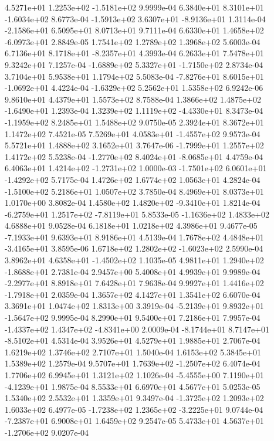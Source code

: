  4.5271e+01  1.2253e+02 -1.5181e+02  9.9999e-04
 6.3840e+01  8.3101e+01 -1.6034e+02  8.6773e-04
-1.5913e+02  3.6307e+01 -8.9136e+01  1.3114e-04
-2.1586e+01  6.5095e+01  8.0713e+01  9.7111e-04
 6.6330e+01  1.4658e+02 -6.0973e+01  2.8849e-05
1.7541e+02 1.2789e+02 1.3968e+02  5.6003e-04
 6.7136e+01  8.1718e+01 -8.2357e+01  4.3993e-04
6.2633e+01 7.5478e+01 9.3242e+01  7.1257e-04
-1.6889e+02  5.3327e+01 -1.7150e+02  2.8734e-04
3.7104e+01 5.9538e+01 1.1794e+02  5.5083e-04
-7.8276e+01  8.6015e+01 -1.0692e+01  4.4224e-04
-1.6329e+02  5.2562e+01  1.5358e+02  6.9242e-06
9.8610e+01 4.4379e+01 1.5573e+02  8.7588e-04
 1.3866e+02  1.4875e+02 -1.6490e+01  1.2393e-04
 1.3239e+02  1.1119e+02 -4.4330e+01  8.3473e-04
-1.1959e+02  8.2485e+01  1.5488e+02  9.0750e-05
2.3924e+01 8.3672e+01 1.1472e+02  7.4521e-05
 7.5269e+01  4.0583e+01 -1.4557e+02  9.9573e-04
5.5721e+01 1.4888e+02 3.1652e+01  3.7647e-06
-1.7999e+01  1.2557e+02  1.4172e+02  5.5238e-04
-1.2770e+02  8.4024e+01 -8.0685e+01  4.4759e-04
 6.4063e+01  1.4214e+02 -1.2731e+02  1.0000e-03
-1.7501e+02  6.0601e+01 -1.4292e+02  5.7175e-04
1.4726e+02 1.6774e+02 1.0563e+01  4.2824e-04
-1.5100e+02  5.2186e+01  1.0507e+02  3.7850e-04
8.4969e+01 8.0373e+01 1.0170e+00  3.8082e-04
 1.4580e+02  1.4820e+02 -9.3410e+01  1.8214e-04
-6.2759e+01  1.2517e+02 -7.8119e+01  5.8533e-05
-1.1636e+02  1.4833e+02  4.6888e+01  9.0528e-04
6.1818e+01 1.0218e+02 4.3986e+01  9.4677e-05
-7.1933e+01  9.6393e+01  8.9186e+01  4.5139e-04
 1.7678e+02  4.4848e+01 -3.4165e+01  3.8595e-06
 1.6718e+02  1.2802e+02 -1.6023e+02  2.5990e-04
 3.8962e+01  4.6358e+01 -1.4502e+02  1.1035e-05
 4.9811e+01  1.2940e+02 -1.8688e+01  2.7381e-04
2.9457e+00 5.4008e+01 4.9939e+01  9.9989e-04
-2.2977e+01  8.8918e+01  7.6428e+01  7.9638e-04
 9.9927e+01  1.4416e+02 -1.7918e+01  2.0359e-04
1.3657e+02 4.1427e+01 1.3541e+02  6.6070e-04
3.3691e+01 1.0474e+02 1.8313e+00  3.3919e-04
-5.2139e+01  9.8932e+01 -1.5647e+02  9.9995e-04
8.2990e+01 9.5400e+01 7.2186e+01  7.9957e-04
-1.4337e+02  1.4347e+02 -4.8341e+00  2.0009e-04
-8.1744e+01  8.7147e+01 -8.5102e+01  4.5314e-04
3.9526e+01 4.5279e+01 1.9885e+01  2.7067e-04
1.6219e+02 1.3746e+02 2.7107e+01  1.5040e-04
1.6153e+02 5.3845e+01 1.5389e+02  1.2579e-04
 9.5707e+01  1.7639e+02 -1.2507e+02  6.4074e-04
1.7706e+02 6.9945e+01 1.3121e+02  1.1026e-04
-5.4555e+00  7.1190e+01 -4.1239e+01  1.9875e-04
8.5533e+01 6.6970e+01 4.5677e+01  5.0253e-05
1.5340e+02 2.5532e+01 1.3359e+01  9.3497e-04
-1.3725e+02  1.2093e+02  1.6033e+02  6.4977e-05
-1.7238e+02  1.2365e+02 -3.2225e+01  9.0744e-04
-7.2387e+01  6.9008e+01  1.6459e+02  9.2547e-05
 5.4733e+01  4.5637e+01 -1.2706e+02  9.0207e-04

